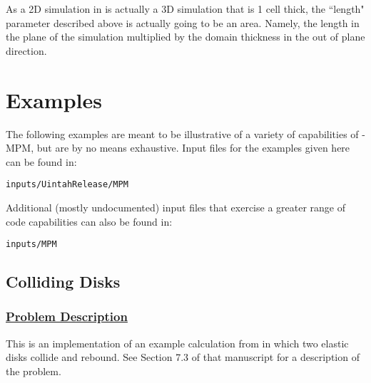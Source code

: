 As a 2D simulation in \Vaango is actually a 3D simulation that is 1 cell thick,
the ``length" parameter described above is actually going to be an area.
Namely, the length in the plane of the simulation multiplied by the domain
thickness in the out of plane direction.


%
\section{Examples} \label{Sec:ExamplesMPM}

The following examples are meant to be illustrative of a variety of
capabilities of \Vaango-MPM, but are by no means exhaustive.  Input files
for the examples given here can be found in:
\begin{lstlisting}[backgroundcolor=\color{background}]
inputs/UintahRelease/MPM
\end{lstlisting}

Additional (mostly undocumented) input files that exercise a greater range
of code capabilities can also be found in:
\begin{lstlisting}[backgroundcolor=\color{background}]
inputs/MPM
\end{lstlisting}

\newpage
\subsection*{\center Colliding Disks}
\subsubsection*{\underline{Problem Description}}
This is an implementation of an example calculation from \cite{Sulsky1994} in
which two elastic disks collide and rebound.  See Section 7.3 of that
manuscript for a description of the problem.
 
